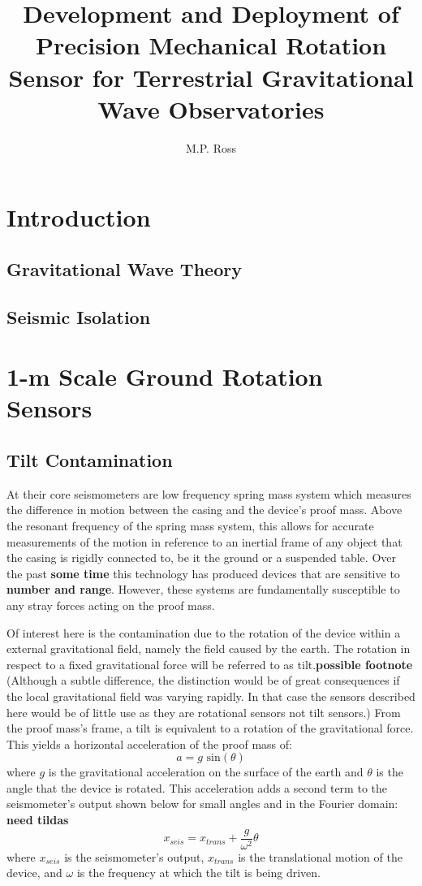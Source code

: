\documentclass[12pt]{article}
\begin{document}
\title{Development and Deployment of Precision Mechanical Rotation Sensor for Terrestrial Gravitational Wave Observatories}

\author{M.P. Ross}

\maketitle

\section{Introduction}
\subsection{Gravitational Wave Theory}
\subsection{Seismic Isolation}

\section{1-m Scale Ground Rotation Sensors}
\subsection{Tilt Contamination}
\quad At their core seismometers are low frequency spring mass system which measures the difference in motion between the casing and the device's proof mass. Above the resonant frequency of the spring mass system, this allows for accurate measurements of the motion in reference to an inertial frame of any object that the casing is rigidly connected to, be it the ground or a suspended table. Over the past \textbf{some time} this technology has produced devices that are sensitive to \textbf{number and range}. However, these systems are fundamentally susceptible to any stray forces acting on the proof mass.

Of interest here is the contamination due to the rotation of the device within a external gravitational field, namely the field caused by the earth. The rotation in respect to a fixed gravitational force will be referred to as tilt.\textbf{possible footnote} (Although a subtle difference, the distinction would be of great consequences if the local gravitational field was varying rapidly. In that case the sensors described here would be of little use as they are rotational sensors not tilt sensors.) From the proof mass's frame, a tilt is equivalent to a rotation of the gravitational force. This yields a horizontal acceleration of the proof mass of:
\[ a=g \text{ sin}(\theta)\]
where $g$ is the gravitational acceleration on the surface of the earth and $\theta$ is the angle that the device is rotated. This acceleration adds a second term to the seismometer's output shown below for small angles and in the Fourier domain: \textbf{need tildas}
\[x_{seis}=x_{trans}+\frac{g}{\omega^2}\theta\]
where $x_{seis}$ is the seismometer's output, $x_{trans}$ is the translational motion of the device, and $\omega$ is the frequency at which the tilt is being driven. 
\end{document}
